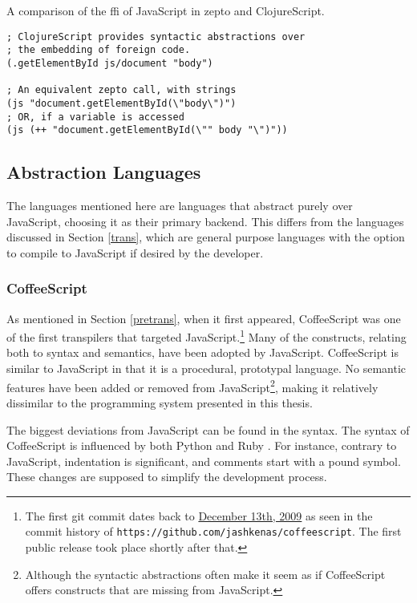 \documentclass[oneside,11pt,xetex]{scrbook}
\begin{document}
\begin{listing}[H]
\caption{A comparison of the \gls{ffi} of JavaScript in zepto and ClojureScript.}
\begin{verbatim}
; ClojureScript provides syntactic abstractions over
; the embedding of foreign code.
(.getElementById js/document "body")

; An equivalent zepto call, with strings
(js "document.getElementById(\"body\")")
; OR, if a variable is accessed
(js (++ "document.getElementById(\"" body "\")"))
\end{verbatim}
\end{listing}

\subsection{Abstraction Languages}

The languages mentioned here are languages that abstract purely over JavaScript,
choosing it as their primary backend. This differs from the languages discussed
in Section \ref{trans}, which are general purpose languages with the option to compile
to JavaScript if desired by the developer.

\subsubsection{CoffeeScript}

As mentioned in Section \ref{pretrans}, when it first appeared, CoffeeScript was one of the first transpilers that targeted JavaScript.\footnote{The first git commit
dates back to
\href{https://github.com/jashkenas/coffeescript/commit/8e9d637985d2dc9b44922076ad54ffef7fa8e9c2}{December 13th, 2009} as seen in the
commit history of \texttt{https://github.com/jashkenas/coffeescript}.
The first public release took place shortly after that.} Many of the constructs,
relating both to syntax and semantics, have been adopted by JavaScript.
CoffeeScript is similar to JavaScript in that it is a procedural, prototypal
language. No semantic features have been added or removed from JavaScript\footnote{Although
the syntactic abstractions often make it seem as if CoffeeScript offers
constructs that are missing from JavaScript.}, making it relatively
dissimilar to the programming system presented in this thesis.

The biggest deviations from JavaScript can be found in the syntax.
The syntax of CoffeeScript is influenced by both Python and Ruby \parencite{COFF}.
For instance, contrary to JavaScript, indentation is significant, and
comments start with a pound symbol. These changes are supposed to simplify
the development process.
\end{document}
